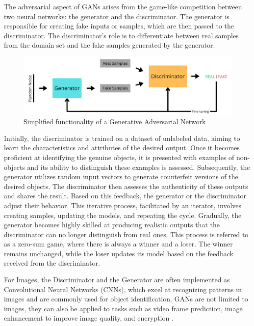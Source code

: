 The adversarial aspect of GANs arises from the game-like competition between two neural networks: the generator and the discriminator. The generator is responsible for creating fake inputs or samples, which are then passed to the discriminator. The discriminator's role is to differentiate between real samples from the domain set and the fake samples generated by the generator.

\begin{figure}[ht]
\centering
  \includegraphics[width=1\columnwidth]{figures/Generator.png}
  \caption{Simplified functionality of a Generative Adversarial Network}
  \label{fig:figureGAN}
\end{figure}

Initially, the discriminator is trained on a dataset of unlabeled data, aiming to learn the characteristics and attributes of the desired output. Once it becomes proficient at identifying the genuine objects, it is presented with examples of non-objects and its ability to distinguish these examples is assessed. 
Subsequently, the generator utilizes random input vectors to generate counterfeit versions of the desired objects. 
The discriminator then assesses the authenticity of these outputs and shares the result. Based on this feedback, the generator or the discriminator adjust their behavior. This iterative process, facilitated by an iterator, involves creating samples, updating the models, and repeating the cycle. Gradually, the generator becomes highly skilled at producing realistic outputs that the discriminator can no longer distinguish from real ones. This process is referred to as a zero-sum game, where there is always a winner and a loser. The winner remains unchanged, while the loser updates its model based on the feedback received from the discriminator.

For Images, the Discriminator and the Generator are often implemented as Convolutional Neural Networks (CNNs), which excel at recognizing patterns in images and are commonly used for object identification.
GANs are not limited to images, they can also be applied to tasks such as video frame prediction, image enhancement to improve image quality, and encryption \citep{goodfellowGAN}.

